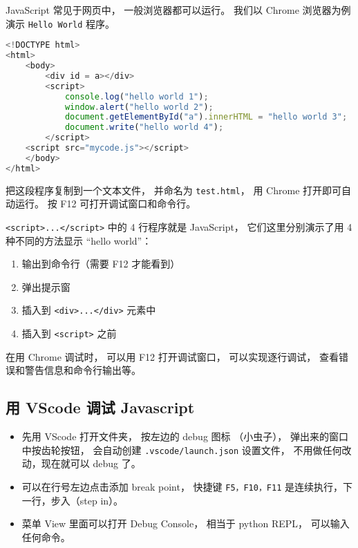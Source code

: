 
JavaScript 常见于网页中， 一般浏览器都可以运行。 我们以 Chrome 浏览器为例演示 \verb|Hello World| 程序。

\begin{lstlisting}[language=js]
<!DOCTYPE html>
<html>
	<body>
		<div id = a></div>
		<script>
            console.log("hello world 1");
            window.alert("hello world 2");
			document.getElementById("a").innerHTML = "hello world 3";
            document.write("hello world 4");
		</script>
    <script src="mycode.js"></script>
	</body>
</html>
\end{lstlisting}
把这段程序复制到一个文本文件， 并命名为 \verb|test.html|， 用 Chrome 打开即可自动运行。 按 F12 可打开调试窗口和命令行。

\verb|<script>...</script>| 中的 4 行程序就是 JavaScript， 它们这里分别演示了用 4 种不同的方法显示 “hello world”：
\begin{enumerate}
\item 输出到命令行（需要 F12 才能看到）
\item 弹出提示窗
\item 插入到 \verb|<div>...</div>| 元素中
\item 插入到 \verb|<script>| 之前
\end{enumerate}

在用 Chrome 调试时， 可以用 F12 打开调试窗口， 可以实现逐行调试， 查看错误和警告信息和命令行输出等。

\subsection{用 VScode 调试 Javascript}
\begin{itemize}
\item 先用 VScode 打开文件夹， 按左边的 debug 图标 （小虫子）， 弹出来的窗口中按齿轮按钮， 会自动创建 \verb`.vscode/launch.json` 设置文件， 不用做任何改动，现在就可以 debug 了。
\item 可以在行号左边点击添加 break point， 快捷键 \verb`F5，F10，F11` 是连续执行，下一行，步入（step in）。
\item 菜单 View 里面可以打开 Debug Console， 相当于 python REPL， 可以输入任何命令。
\end{itemize}

